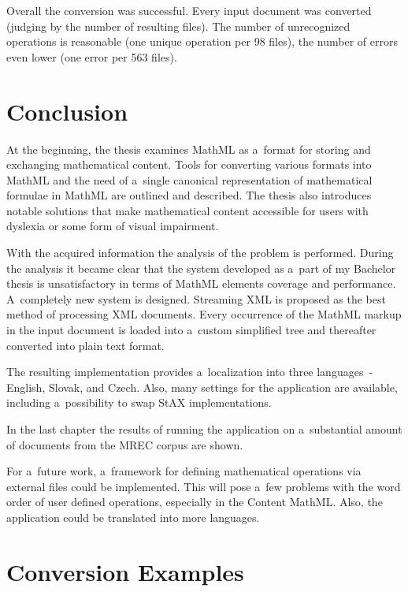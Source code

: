 \documentclass[11pt,oneside,final]{fithesis2}
\def\s#1{#1\index{#1}}
\begin{document}
Overall the conversion was successful. Every input document was converted (judging by the number of resulting files). The number of unrecognized operations is reasonable (one unique operation per 98 files), the number of errors even lower (one error per 563 files).

\chapter{Conclusion}
At the beginning, the thesis examines \s{MathML} as a~format for storing and exchanging mathematical content. Tools for converting various formats into MathML and the need of a~single canonical representation of mathematical formulae in MathML are outlined and described. The thesis also introduces notable solutions that make mathematical content accessible for users with dyslexia or some form of visual impairment. 

With the acquired information the analysis of the problem is performed. During the analysis it became clear that the system developed as a~part of my Bachelor thesis is unsatisfactory in terms of MathML elements coverage and performance. A~completely new system is designed. Streaming XML is proposed as the best method of processing XML documents. Every occurrence of the MathML markup in the input document is loaded into a~custom simplified tree and thereafter converted into plain text format. 

The resulting implementation provides a~localization into three languages~- English, Slovak, and Czech. Also, many settings for the application are available, including a~possibility to swap \s{StAX} implementations.  

In the last chapter the results of running the application on a~substantial amount of documents from the MREC corpus are shown. 

For a~future work, a~framework for defining mathematical operations via external files could be implemented. This will pose a~few problems with the word order of user defined operations, especially in the Content MathML. Also, the application could be translated into more languages. 

\clearpage
{}



\appendix
\chapter{Conversion Examples}
\label{appendix:conversionexamples}
\end{document}
